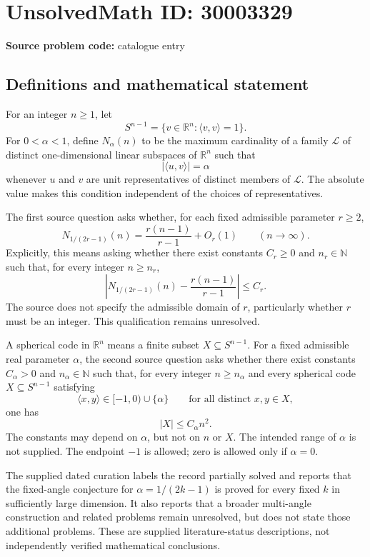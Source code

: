 \documentclass[11pt]{article}
\newcommand{\N}{\mathbb{N}}
\newcommand{\R}{\mathbb{R}}
\begin{document}
\section*{UnsolvedMath ID: 30003329}
\textbf{Source problem code:} catalogue entry
\subsection{Definitions and mathematical statement}
For an integer \(n\geq 1\), let
\[
S^{n-1}=\{v\in\R^n:\langle v,v\rangle=1\}.
\]
For \(0<\alpha<1\), define \(N_\alpha(n)\) to be the maximum cardinality of a family \(\mathcal L\) of distinct one-dimensional linear subspaces of \(\R^n\) such that
\[
|\langle u,v\rangle|=\alpha
\]
whenever \(u\) and \(v\) are unit representatives of distinct members of \(\mathcal L\). The absolute value makes this condition independent of the choices of representatives.

The first source question asks whether, for each fixed admissible parameter \(r\geq2\),
\[
N_{1/(2r-1)}(n)=\frac{r(n-1)}{r-1}+O_r(1)
\qquad(n\to\infty).
\]
Explicitly, this means asking whether there exist constants \(C_r\geq0\) and \(n_r\in\N\) such that, for every integer \(n\geq n_r\),
\[
\left|N_{1/(2r-1)}(n)-\frac{r(n-1)}{r-1}\right|\leq C_r.
\]
The source does not specify the admissible domain of \(r\), particularly whether \(r\) must be an integer. This qualification remains unresolved.

A spherical code in \(\R^n\) means a finite subset \(X\subseteq S^{n-1}\). For a fixed admissible real parameter \(\alpha\), the second source question asks whether there exist constants \(C_\alpha>0\) and \(n_\alpha\in\N\) such that, for every integer \(n\geq n_\alpha\) and every spherical code \(X\subseteq S^{n-1}\) satisfying
\[
\langle x,y\rangle\in[-1,0)\cup\{\alpha\}
\qquad\text{for all distinct }x,y\in X,
\]
one has
\[
|X|\leq C_\alpha n^2.
\]
The constants may depend on \(\alpha\), but not on \(n\) or \(X\). The intended range of \(\alpha\) is not supplied. The endpoint \(-1\) is allowed; zero is allowed only if \(\alpha=0\).

The supplied dated curation labels the record partially solved and reports that the fixed-angle conjecture for \(\alpha=1/(2k-1)\) is proved for every fixed \(k\) in sufficiently large dimension. It also reports that a broader multi-angle construction and related problems remain unresolved, but does not state those additional problems. These are supplied literature-status descriptions, not independently verified mathematical conclusions.
\end{document}
